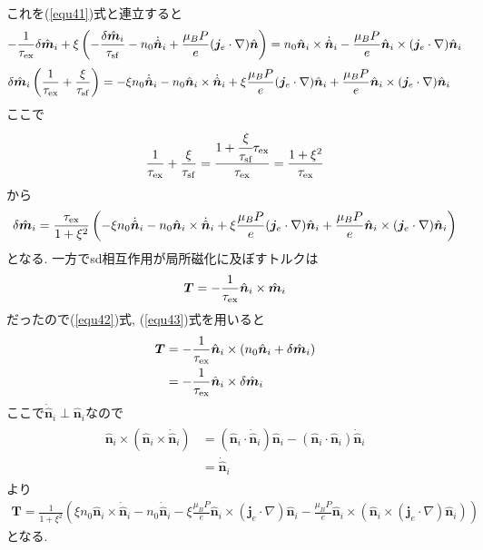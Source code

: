 \documentclass[uplatex,a4j,11pt,dvipdfmx]{jsarticle}
\begin{document}
これを(\ref{equ41})式と連立すると
\begin{align*}
  \begin{split}
    -\frac{1}{\tau_{\rm ex}}\delta\hat{\bm m}_i
    +\xi\left(-\frac{\delta\hat{\bm m}_i}{\tau_{\rm sf}}-n_0\dot{\hat{\bm n}}_i+\frac{\mu_BP}{e}({\bm j}_e\cdot\nabla)\hat{\bm n}\right)
    =n_0\hat{\bm n}_i\times\dot{\hat{\bm n}}_i-\frac{\mu_BP}{e}\hat{\bm n}_i\times({\bm j}_e\cdot\nabla)\hat{\bm n}_i\\
  \end{split}
\end{align*}
\begin{align}
  \delta\hat{\bm m}_i\left(\frac{1}{\tau_{\rm ex}}+\frac{\xi}{\tau_{\rm sf}}\right)
    &=-\xi n_0\dot{\hat{\bm n}}_i-n_0\hat{\bm n}_i\times\dot{\hat{\bm n}}_i
    +\xi\frac{\mu_BP}{e}({\bm j}_e\cdot\nabla)\hat{\bm n}_i+\frac{\mu_BP}{e}\hat{\bm n}_i\times({\bm j}_e\cdot\nabla)\hat{\bm n}_i
\end{align}
ここで
\begin{align}
  \frac{1}{\tau_{\rm ex}}+\frac{\xi}{\tau_{\rm sf}}=\frac{1+\cfrac{\xi}{\tau_{\rm sf}}\tau_{\rm ex}}{\tau_{\rm ex}}=\frac{1+\xi^2}{\tau_{\rm ex}}
\end{align}
から
\begin{align}
  \label{equ43}
  \delta\hat{\bm m}_i=\frac{\tau_{\rm ex}}{1+\xi^2}\left(
    -\xi n_0\dot{\hat{\bm n}}_i-n_0\hat{\bm n}_i\times\dot{\hat{\bm n}}_i
    +\xi\frac{\mu_BP}{e}({\bm j}_e\cdot\nabla)\hat{\bm n}_i+\frac{\mu_BP}{e}\hat{\bm n}_i\times({\bm j}_e\cdot\nabla)\hat{\bm n}_i
  \right)
\end{align}
となる.
一方でsd相互作用が局所磁化に及ぼすトルクは
\begin{align}
  {\bm T}=-\frac{1}{\tau_{\rm ex}}\hat{\bm n}_i\times\hat{\bm m}_i
\end{align}
だったので(\ref{equ42})式, (\ref{equ43})式を用いると
\begin{align}
  \begin{split}
    {\bm T}&=-\frac{1}{\tau_{\rm ex}}\hat{\bm n}_i\times(n_0\hat{\bm n}_i+\delta\hat{\bm m}_i)\\
    &=-\frac{1}{\tau_{\rm ex}}\hat{\bm n}_i\times\delta\hat{\bm m}_i
  \end{split}
\end{align}
ここで$\dot{\hat{\bm n}}_i\perp\hat{\bm n}_i$なので
\begin{align}
  \begin{split}
    \hat{\bm n}_i\times(\hat{\bm n}_i\times\dot{\hat{\bm n}}_i)&=(\hat{\bm n}_i\cdot\dot{\hat{\bm n}}_i)\hat{\bm n}_i-(\hat{\bm n}_i\cdot\hat{\bm n}_i)\dot{\hat{\bm n}}_i\\
    &=\dot{\hat{\bm n}}_i
  \end{split}
\end{align}
より
\begin{align}
  {\bm T}=\frac{1}{1+\xi^2}\left(
    \xi n_0\hat{\bm n}_i\times\dot{\hat{\bm n}}_i
    -n_0\dot{\hat{\bm n}}_i
    -\xi\frac{\mu_BP}{e}\hat{\bm n}_i\times({\bm j}_e\cdot\nabla)\hat{\bm n}_i-\frac{\mu_BP}{e}\hat{\bm n}_i\times\left(\hat{\bm n}_i\times({\bm j}_e\cdot\nabla)\hat{\bm n}_i\right)
    \right)
\end{align}
となる.

\end{document}
